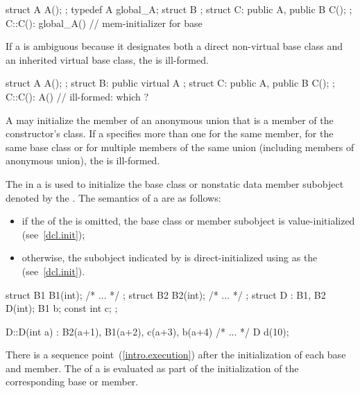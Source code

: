 \begin{codeblock}
struct A { A(); };
typedef A global_A;
struct B { };
struct C: public A, public B { C(); };
C::C(): global_A() { }		// mem-initializer for base 
\end{codeblock}
\exitexampleb
If a
is ambiguous because it designates both a direct non-virtual base class and
an inherited virtual base class, the
is ill-formed.
\enterexample

\begin{codeblock}
struct A { A(); };
struct B: public virtual A { };
struct C: public A, public B { C(); };
C::C(): A() { }                 // ill-formed: which ?
\end{codeblock}
\exitexampleb
A
may initialize the member of an anonymous union that is a member of the
constructor's class.
If a
specifies more than one
for the same member, for the same base class or for multiple members of the
same union (including members of anonymous union),
the
is ill-formed.

\pnum
{}%
%
The
in a
is used to initialize the base class or nonstatic data member
subobject denoted by the . The semantics
of a  are as follows:

\begin{itemize}
\item if the  of the 
is omitted, the base class or member subobject is value-initialized
(see~\ref{dcl.init});
\item otherwise, the subobject indicated by 
is direct-initialized using  as the
 (see~\ref{dcl.init}).
\end{itemize}

\enterexample

\begin{codeblock}
struct B1 { B1(int); /* ... */ };
struct B2 { B2(int); /* ... */ };
struct D : B1, B2 {
    D(int);
    B1 b;
    const int c;
};

D::D(int a) : B2(a+1), B1(a+2), c(a+3), b(a+4)
{ /* ... */ }
D d(10);
\end{codeblock}
\exitexampleb
There is a sequence point~(\ref{intro.execution}) after the initialization
of each base and member. The  of a
 is evaluated as part of the initialization
of the corresponding base or member.

